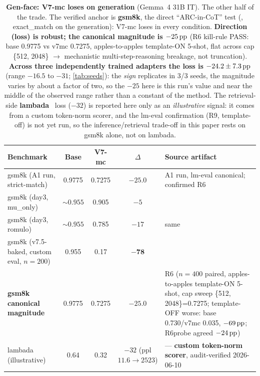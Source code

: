 \begin{table}[tbp]
\centering
\begin{threeparttable}
\caption{\textbf{Gen-face: V7-mc loses on generation} (Gemma~4 31B IT). The other
half of the trade. The verified anchor is \textbf{gsm8k}, the direct ``ARC-in-CoT''
test (, exact\_match on the generation): V7-mc loses in every
condition. \textbf{Direction (loss) is robust; the canonical magnitude is
$-25\pp$} (R6 kill-rule PASS: base 0.9775 vs v7mc 0.7275, apples-to-apples
template-ON 5-shot, flat across cap \{512, 2048\} $\rightarrow$ mechanistic
multi-step-reasoning breakage, not truncation). \textbf{Across three independently
trained adapters the loss is $-24.2 \pm 7.3\pp$} (range $-16.5$ to $-31$;
\cref{tab:seeds}): the \emph{sign} replicates in 3/3 seeds, the magnitude varies by
about a factor of two, so the $-25$ here is this run's value and near the middle of
the observed range rather than a constant of the method. The retrieval-side \textbf{lambada}~\citep{LAMBADA}
loss ($-32$) is reported here only as an \emph{illustrative} signal: it comes from a
custom token-norm scorer, and the lm-eval confirmation (R9, 
template-off) is not yet run, so the inference/retrieval trade-off in this paper
rests on gsm8k alone, not on lambada.}
\label{tab:genface}
\small
\begin{tabular}{L{4.5cm}cccL{4.6cm}}
\toprule
Benchmark & Base & V7-mc & $\Delta$ & Source artifact \\
\midrule
gsm8k (A1 run, strict-match) & 0.9775 & 0.7275 & $\mathbf{-25.0}$ & A1 run, lm-eval
canonical; confirmed R6 \\
gsm8k (day3, mu\_only) & ${\sim}0.955$ & 0.905 & $-5$ &
 \\
gsm8k (day3, romulo) & ${\sim}0.955$ & 0.785 & $-17$ & same \\
gsm8k (v7.5-baked, custom eval, $n{=}200$) & 0.955 & 0.17 & $\mathbf{-78}$ &
 \\
\textbf{gsm8k canonical magnitude} & 0.9775 & 0.7275 & $\mathbf{-25.0}$ & R6
($n{=}400$ paired, apples-to-apples template-ON 5-shot, cap sweep
\{512, 2048\}=0.7275; template-OFF worse: base 0.730/v7mc 0.035, $-69\,\mathrm{pp}$; R6probe
agreed $-24\,\mathrm{pp}$) \\
lambada (illustrative) & 0.64 & 0.32 & $-32$ (ppl $11.6{\rightarrow}2523$) &
 --- \textbf{custom token-norm
scorer}, audit-verified 2026-06-10 \\
\bottomrule
\end{tabular}
\end{threeparttable}
\end{table}

